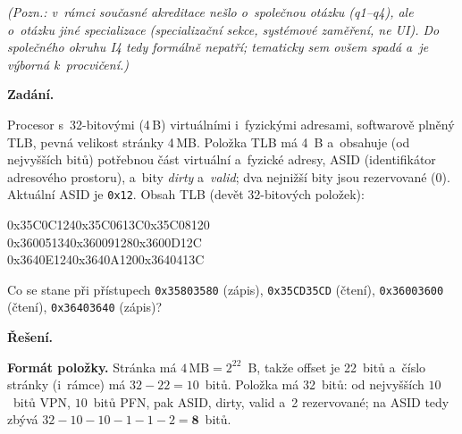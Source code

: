 \begin{priklad}
\par
\noindent\textit{(Pozn.: v~rámci současné akreditace nešlo o~společnou otázku (q1--q4), ale o~otázku jiné specializace (specializační sekce, systémové zaměření, ne UI). Do společného okruhu I4 tedy formálně nepatří; tematicky sem ovšem spadá a~je výborná k~procvičení.)}\par
\textbf{Zadání.}\par
Procesor s~32-bitovými (4\,B) virtuálními i~fyzickými adresami, softwarově plněný TLB, pevná velikost stránky 4\,MB. Položka TLB má 4~B a~obsahuje (od nejvyšších bitů) potřebnou část virtuální a~fyzické adresy, ASID (identifikátor adresového prostoru), a~bity \emph{dirty} a~\emph{valid}; dva nejnižší bity jsou rezervované (0). Aktuální ASID je \texttt{0x12}. Obsah TLB (devět 32-bitových položek):
\begin{center}\ttfamily
0x35C0C124\quad 0x35C0613C\quad 0x35C08120\\
0x36005134\quad 0x36009128\quad 0x3600D12C\\
0x3640E124\quad 0x3640A120\quad 0x3640413C
\end{center}
Co se stane při přístupech \texttt{0x35803580} (zápis), \texttt{0x35CD35CD} (čtení), \texttt{0x36003600} (čtení), \texttt{0x36403640} (zápis)?

\medskip
\textbf{Řešení.}\par
\textbf{Formát položky.} Stránka má $4\,\text{MB}=2^{22}$~B, takže offset je 22~bitů a~číslo stránky (i~rámce) má $32-22=10$~bitů. Položka má 32~bitů: od nejvyšších $10$~bitů VPN, $10$~bitů PFN, pak ASID, dirty, valid a~2 rezervované; na ASID tedy zbývá $32-10-10-1-1-2=\mathbf{8}$~bitů.
\begin{center}
%
\end{center}


\end{priklad}
